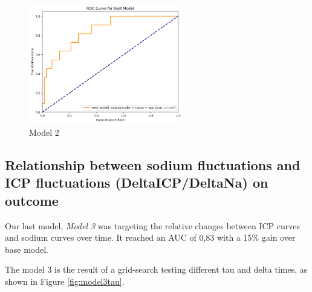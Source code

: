 \begin{figure}[h]
    \centering
    \includegraphics[width=0.6\textwidth]{pictures/fig6_model2.png}
    \caption{Model 2} %
    \label{fig:model2} %
\end{figure}

\subsection{Relationship between sodium fluctuations and ICP fluctuations (DeltaICP/DeltaNa) on outcome}
Our last model, \textit{Model 3} was targeting the relative changes between ICP curves and sodium curves over time. It reached an AUC of 0,83 with a 15\% gain  over base model. 

The model 3 is the result of a grid-search testing different tau and delta times, as shown in Figure \ref{fig:model3tau}.

